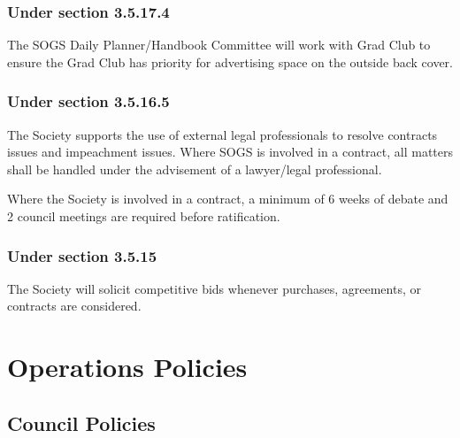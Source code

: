 \subsubsection{Under section 3.5.17.4}
\begin{longenum}[ label*=\thesubsubsection.\arabic*., align=left]
\item  	The SOGS Daily Planner/Handbook Committee will work with Grad Club to ensure the Grad Club has priority for advertising space on the outside back cover.
\end{longenum}

\subsubsection{Under section 3.5.16.5}
\begin{longenum}[ label*=\thesubsubsection.\arabic*., align=left]
\item   	The Society supports the use of external legal professionals to resolve contracts issues and impeachment issues. Where SOGS is involved in a contract, all matters shall be handled under the advisement of a lawyer/legal professional. 
\item Where the Society is involved in a contract, a minimum of 6 weeks of debate and 2 council meetings are required before ratification. 
\end{longenum}

\subsubsection{Under section 3.5.15}
\begin{longenum}[ label*=\thesubsubsection.\arabic*., align=left]
\item   The Society will solicit competitive bids whenever purchases, agreements, or contracts are considered.  
\end{longenum}

\section{Operations Policies}

\subsection{Council Policies}
